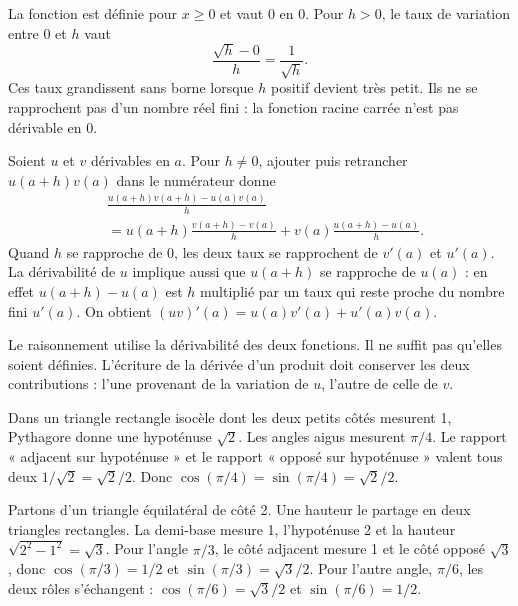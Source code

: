 \clearpage
{}
\begin{demonstration}
La fonction est définie pour $x\geq0$ et vaut 0 en 0. Pour $h>0$,
le taux de variation entre 0 et $h$ vaut
\[\frac{\sqrt h-0}{h}=\frac1{\sqrt h}.\]
Ces taux grandissent sans borne lorsque $h$ positif devient très petit.
Ils ne se rapprochent pas d'un nombre réel fini : la fonction racine carrée
n'est pas dérivable en 0.
\end{demonstration}
\begin{demonstration}
Soient $u$ et $v$ dérivables en $a$. Pour $h\neq0$, ajouter puis retrancher
$u(a+h)v(a)$ dans le numérateur donne
\begin{align*}
&\frac{u(a+h)v(a+h)-u(a)v(a)}h\\
&=u(a+h)\frac{v(a+h)-v(a)}h
+v(a)\frac{u(a+h)-u(a)}h.
\end{align*}
Quand $h$ se rapproche de 0, les deux taux se rapprochent de $v'(a)$ et
$u'(a)$. La dérivabilité de $u$ implique aussi que $u(a+h)$ se rapproche
de $u(a)$ : en effet $u(a+h)-u(a)$ est $h$ multiplié par un taux qui reste
proche du nombre fini $u'(a)$.
On obtient $(uv)'(a)=u(a)v'(a)+u'(a)v(a)$.
\end{demonstration}
\begin{attention}
Le raisonnement utilise la dérivabilité des deux fonctions. Il ne suffit
pas qu'elles soient définies. L'écriture de la dérivée d'un produit doit
conserver les deux contributions : l'une provenant de la variation de $u$,
l'autre de celle de $v$.
\end{attention}
\clearpage
{}
\label{dem-trigonometrie}
\begin{demonstration}[L'angle $\pi/4$]
Dans un triangle rectangle isocèle dont les deux petits côtés mesurent 1,
Pythagore donne une hypoténuse $\sqrt2$. Les angles aigus mesurent $\pi/4$.
Le rapport « adjacent sur hypoténuse » et le rapport « opposé sur hypoténuse »
valent tous deux $1/\sqrt2=\sqrt2/2$.
Donc $\cos(\pi/4)=\sin(\pi/4)=\sqrt2/2$.
\end{demonstration}
\begin{demonstration}
Partons d'un triangle équilatéral de côté 2. Une hauteur le partage en deux
triangles rectangles. La demi-base mesure 1, l'hypoténuse 2 et la hauteur
$\sqrt{2^2-1^2}=\sqrt3$.
Pour l'angle $\pi/3$, le côté adjacent mesure 1 et le côté opposé $\sqrt3$,
donc $\cos(\pi/3)=1/2$ et $\sin(\pi/3)=\sqrt3/2$.
Pour l'autre angle, $\pi/6$, les deux rôles s'échangent :
$\cos(\pi/6)=\sqrt3/2$ et $\sin(\pi/6)=1/2$.
\end{demonstration}
